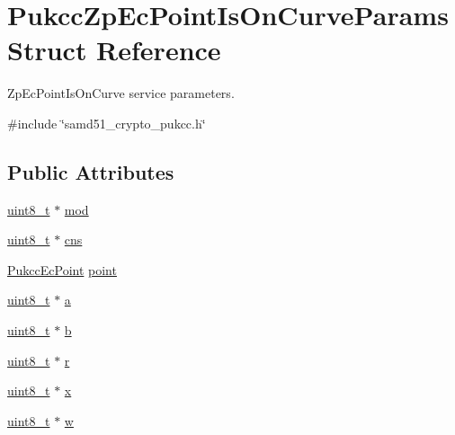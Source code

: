 \hypertarget{structPukccZpEcPointIsOnCurveParams}{}\section{Pukcc\+Zp\+Ec\+Point\+Is\+On\+Curve\+Params Struct Reference}
\label{structPukccZpEcPointIsOnCurveParams}


Zp\+Ec\+Point\+Is\+On\+Curve service parameters.  




{\ttfamily \#include \char`\"{}samd51\+\_\+crypto\+\_\+pukcc.\+h\char`\"{}}

\subsection*{Public Attributes}
\begin{DoxyCompactItemize}
\item 
\hyperlink{stdint_8h_aba7bc1797add20fe3efdf37ced1182c5}{uint8\+\_\+t} $\ast$ \hyperlink{structPukccZpEcPointIsOnCurveParams_a43126c13a8c8ca9de12cbaa9fd9021ff}{mod}
\item 
\hyperlink{stdint_8h_aba7bc1797add20fe3efdf37ced1182c5}{uint8\+\_\+t} $\ast$ \hyperlink{structPukccZpEcPointIsOnCurveParams_a232e6929e51d0752219b1bae67828483}{cns}
\item 
\hyperlink{structPukccEcPoint}{Pukcc\+Ec\+Point} \hyperlink{structPukccZpEcPointIsOnCurveParams_a5ccfdf230b4aea9c8f5e5e185499c4de}{point}
\item 
\hyperlink{stdint_8h_aba7bc1797add20fe3efdf37ced1182c5}{uint8\+\_\+t} $\ast$ \hyperlink{structPukccZpEcPointIsOnCurveParams_a84c61e658ba58db00bd8a60aaeedfa1a}{a}
\item 
\hyperlink{stdint_8h_aba7bc1797add20fe3efdf37ced1182c5}{uint8\+\_\+t} $\ast$ \hyperlink{structPukccZpEcPointIsOnCurveParams_a6d13e2ae39ad5cd57daff1f1be7963e8}{b}
\item 
\hyperlink{stdint_8h_aba7bc1797add20fe3efdf37ced1182c5}{uint8\+\_\+t} $\ast$ \hyperlink{structPukccZpEcPointIsOnCurveParams_a91dff80f05aff699428a6e803cda0e81}{r}
\item 
\hyperlink{stdint_8h_aba7bc1797add20fe3efdf37ced1182c5}{uint8\+\_\+t} $\ast$ \hyperlink{structPukccZpEcPointIsOnCurveParams_aef767e9a73923ea5d20df44cf89d7228}{x}
\item 
\hyperlink{stdint_8h_aba7bc1797add20fe3efdf37ced1182c5}{uint8\+\_\+t} $\ast$ \hyperlink{structPukccZpEcPointIsOnCurveParams_a61dd44da18307b2728ad775385e3714b}{w}
\end{DoxyCompactItemize}


